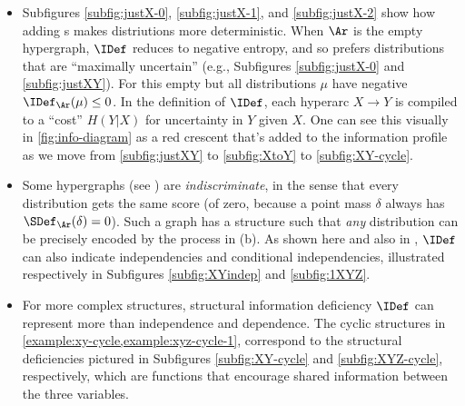 \begin{itemize}
	\item
Subfigures \ref{subfig:justX-0}, \ref{subfig:justX-1}, 
    and \ref{subfig:justX-2} show
    how adding \arc s makes distriutions more deterministic.
When $\Ar$ is the empty hypergraph, $\IDef$ reduces to negative entropy,
and so prefers distributions that are ``maximally uncertain''
 	(e.g., Subfigures \ref{subfig:justX-0} and \ref{subfig:justXY}).
For this empty
    but all distributions $\mu$ have negative $\IDef_{\Ar}(\mu) \le 0$.
In the definition of $\IDef$, each hyperarc $X\to Y$ is compiled to a ``cost'' $H(Y|X)$ 
    for uncertainty in $Y$ given $X$.
One can see this visually in \cref{fig:info-diagram}
    as a red crescent that's added to the information profile as we move 
    from \ref{subfig:justXY} to \ref{subfig:XtoY} to \ref{subfig:XY-cycle}.

\item
Some hypergraphs (see ) are \emph{indiscriminate}, in the sense that every distribution gets the same score
(of zero, because a point mass $\delta$ always has $\SDef_{\Ar}(\delta) = 0$).
Such a graph has a structure such that \emph{any} distribution can be precisely encoded by the process in (b).
As shown here and also in \citet{pdg-aaai}, $\IDef$ can also indicate independencies and conditional independencies, illustrated respectively in Subfigures \ref{subfig:XYindep} and \ref{subfig:1XYZ}.

\item
For more complex structures, structural information deficiency $\IDef$ 
can represent more than independence and dependence. 
The cyclic structures in \cref{example:xy-cycle,example:xyz-cycle-1}, 
    correspond to the structural deficiencies pictured
    in Subfigures \ref{subfig:XY-cycle} and \ref{subfig:XYZ-cycle}, respectively,
    which are functions that encourage shared information between the three variables. 

\end{itemize}
